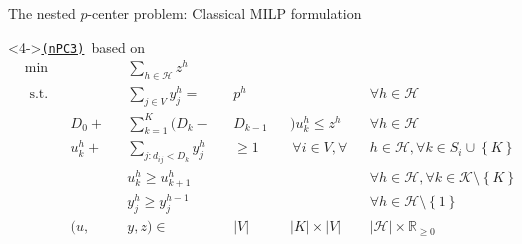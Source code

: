 \documentclass[utf8,aspectratio=169,ngerman,english]{beamer}
\newcommand{\nPCE}{\hyperref[eq:nPCE]{\texttt{(nPC3)}}}
\newcommand{\inH}{h \in \mathcal H}
\begin{document}
\begin{frame}{The nested $p$-center problem: Classical MILP formulation}
\begin{minipage}[t]{0.59\linewidth}
        \begin{block}<4->{\nPCE\ based on \cite{Elloumi2018}}
            \vspace*{-10pt}
            \begin{subequations}
                \begin{alignat*}{9}
                     & \min         &  &           &  & \sum_{\inH}z^{h}            &  &         &  &                           &  &                                                                                    \\
                     & \text{ s.t.} &  &           &  & \sum_{j \in V}y_{j}^h =     &  & p^{h}   &  &                           &  & \forall \inH                                                                       \\
                     &              &  & D_0 +     &  & \sum_{k=1}^{K} (D_k-        &  & D_{k-1} &  & )u^{h}_k \leq z^h \;      &  & \forall h \in \mathcal{H}                                                          \\
                     &              &  & u^{h}_k + &  & \sum_{j:d_{ij}<D_k} y_{j}^h &  & \geq 1  &  & \,\forall i \in V,\forall &  & h \in \mathcal H, \forall k \in S_i \cup \left \{K \right \}                       \\
                     &              &  &           &  & u^{h}_k \geq u_{k+1}^h      &  &         &  &                           &  & \forall h \in \mathcal{H}, \forall k \in \mathcal{K} \setminus \left \{K \right \} \\
                     &              &  &           &  & y_{j}^h \geq y_j^{h-1}      &  &         &  &                           &  & \forall \inH \setminus \left \{1 \right \}                                         \\
                     &              &  & (u,       &  & y,z) \in                    &  & |V|     &  & |K| \times |V|            &  & |\mathcal H| \times \mathbb{R}_{\geq 0}
                \end{alignat*}
            \end{subequations}
        \end{block}
    \end{minipage}
\end{frame}
\end{document}
